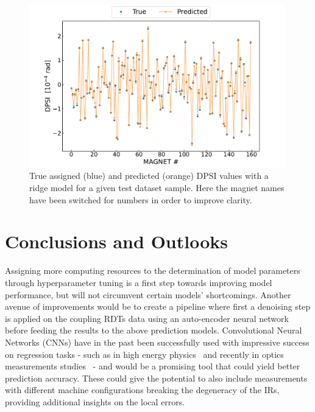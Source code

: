 \begin{figure}[!htb]
    \centering
    \includegraphics*[width=0.99\textwidth]{Figures/ML_for_IR_Coupling/ml_ridge_regression_sample_predictions.pdf}
    \caption{True assigned (\textcolor{mplblue}{blue}) and predicted (\textcolor{mplorange}{orange}) \(\mathrm{DPSI}\) values with a ridge model for a given test dataset sample. Here the magnet names have been switched for numbers in order to improve clarity.}
    \label{figure:ridge_predictions}
\end{figure}

\section{Conclusions and Outlooks}

Assigning more computing resources to the determination of model parameters through hyperparameter tuning is a first step towards improving model performance, but will not circumvent certain models' shortcomings.
Another avenue of improvements would be to create a pipeline where first a denoising step is applied on the coupling RDTs data using an auto-encoder neural network~\cite{folDenoisingOpticsMeasurements2021} before feeding the results to the above prediction models.
Convolutional Neural Networks (CNNs) have in the past been successfully used with impressive success on regression tasks - such as in high energy physics~\cite{JOI:Aurisano:Convolutional_Neural_Network_Neutrino_Event_Classifier} and recently in optics measurements studies~\cite{IPAC:Fol:Optics_Corrections_Using_Machine_Learning_in_the_LHC} - and would be a promising tool that could yield better prediction accuracy.
These could give the potential to also include measurements with different machine configurations breaking the degeneracy of the IRs, providing additional insights on the local errors.

